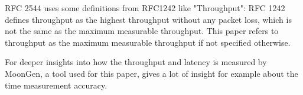 

RFC 2544 uses some definitions from RFC1242 \cite{rfc1242} like
"Throughput": RFC 1242 defines throughput as the highest throughput
without any packet loss, which is not the same as the maximum
measurable throughput. This paper refers to throughput as the
maximum measurable throughput if not specified otherwise.




For deeper insights into how the throughput and latency is measured by
MoonGen, a tool used for this paper, \cite{emmerich2015moongen}
gives a lot of insight for example about the time measurement
accuracy. 



